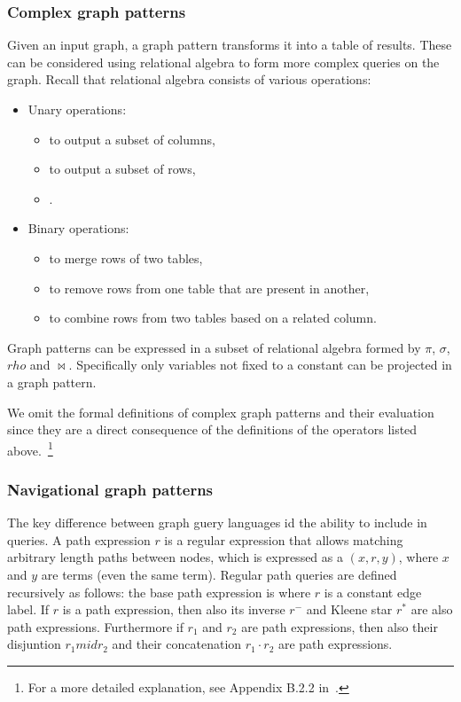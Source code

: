 \subsubsection{Complex graph patterns}
Given an input graph, a graph pattern transforms it into a table of results. These can be considered using relational algebra to form more complex queries on the graph. Recall that relational algebra consists of various operations:
\begin{itemize}
    \item Unary operations:
    \begin{itemize}
        \item {} to output a subset of columns,
        \item {} to output a subset of rows,
        \item {}.
    \end{itemize}
    \item Binary operations:
    \begin{itemize}
        \item {} to merge rows of two tables,
        \item {} to remove rows from one table that are present in another,
        \item {} to combine rows from two tables based on a related column.
    \end{itemize}
\end{itemize}
Graph patterns can be expressed in a subset of relational algebra formed by $\pi$, $\sigma$, $rho$ and $\bowtie$. Specifically only variables not fixed to a constant can be projected in a graph pattern.

We omit the formal definitions of complex graph patterns and their evaluation since they are a direct consequence of the definitions of the operators listed above.~\footnote{For a more detailed explanation, see Appendix B.2.2 in~\cite{Angles2017FoundationmodernQueryLnguagesforGraphDatabases}.}

\subsubsection{Navigational graph patterns}
The key difference between graph guery languages id the ability to include  in queries. A path expression $r$ is a regular expression that allows matching arbitrary length paths between nodes, which is expressed as a  $(x,r,y)$, where $x$ and $y$ are terms (even the same term). Regular path queries are defined recursively as follows: the base path expression is where $r$ is a constant edge label. If $r$ is a path expression, then also its inverse $r^-$ and Kleene star $r^*$ are also path expressions. Furthermore if $r_1$ and $r_2$ are path expressions, then also their disjuntion $r_1mid r_2$ and their concatenation $r_1\cdot r_2$ are path expressions.

